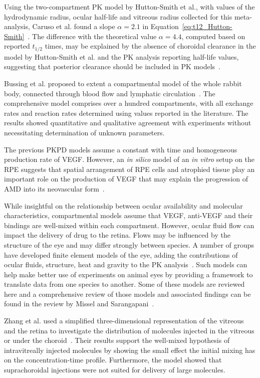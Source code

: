 \documentclass[12pt,a4paper]{journal}
\begin{document}
Using the two-compartment PK model by Hutton-Smith et al., with values of the hydrodynamic radius, ocular half-life and vitreous radius collected for this meta-analysis, Caruso et al. found a slope $\alpha=2.1$ in Equation~\ref{eq:t12_Hutton-Smith}~\cite{Caruso_2020}.
The difference with the theoretical value $\alpha=4.4$, computed based on reported $t_{1/2}$ times, may be explained by the absence of choroidal clearance in the model by Hutton-Smith et al. and the PK analysis reporting half-life values, suggesting that posterior clearance should be included in PK models~\cite{HuttonSmith_2016}.

Bussing et al. proposed to extent a compartmental model of the whole rabbit body, connected through blood flow and lymphatic circulation~\cite{Bussing_2020}.
The comprehensive model comprises over a hundred compartments, with all exchange rates and reaction rates determined using values reported in the literature.
The results showed quantitative and qualitative agreement with experiments without necessitating determination of unknown parameters. 

The previous PKPD models assume a constant with time and homogeneous production rate of VEGF.
However, an \textit{in silico} model of an \textit{in vitro} setup on the RPE suggests that spatial arrangement of RPE cells and atrophied tissue play an important role on the production of VEGF that may explain the progression of AMD into its neovascular form~\cite{Baker_2017}.  

While insightful on the relationship between ocular availability and molecular characteristics, compartmental models assume that VEGF, anti-VEGF and their bindings are well-mixed within each compartment.
However, ocular fluid flow can impact the delivery of drug to the retina.
Flows may be influenced by the structure of the eye and may differ strongly between species.
A number of groups have developed finite element models of the eye, adding the contributions of ocular fluids, structure, heat and gravity to the PK analysis~\cite{Lamminsalo_2018, Missel_2012, Zhang_2018}.
Such models can help make better use of experiments on animal eyes by providing a framework to translate data from one species to another.
Some of these models are reviewed here and a comprehensive review of those models and associated findings can be found in the review by Missel and Sarangapani~\cite{Missel_2019}.

Zhang et al. used a simplified three-dimensional representation of the vitreous and the retina to investigate the distribution of molecules injected in the vitreous or under the choroid~\cite{Zhang_2018}.
Their results support the well-mixed hypothesis of intravitreally injected molecules by showing the small effect the initial mixing has on the concentration-time profile.
Furthermore, the model showed that suprachoroidal injections were not suited for delivery of large molecules.
\end{document}
